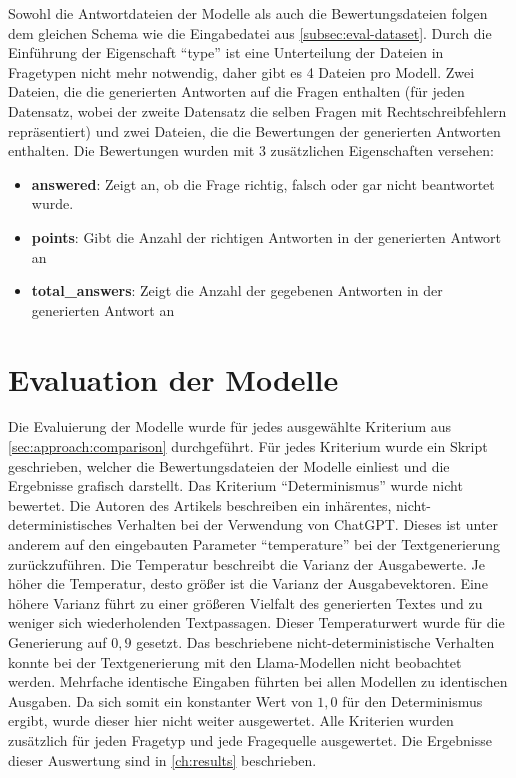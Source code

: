 Sowohl die Antwortdateien der Modelle als auch die Bewertungsdateien folgen dem gleichen Schema wie die Eingabedatei aus \cref{subsec:eval-dataset}. Durch die Einführung der Eigenschaft \enquote{type} ist eine Unterteilung der Dateien in Fragetypen nicht mehr notwendig, daher gibt es 4 Dateien pro Modell.
Zwei Dateien, die die generierten Antworten auf die Fragen enthalten (für jeden Datensatz, wobei der zweite Datensatz die selben Fragen mit Rechtschreibfehlern repräsentiert) und zwei Dateien, die die Bewertungen der generierten Antworten enthalten.
Die Bewertungen wurden mit 3 zusätzlichen Eigenschaften versehen:

\begin{itemize}
    \item \textbf{answered}: Zeigt an, ob die Frage richtig, falsch oder gar nicht beantwortet wurde.
    \item \textbf{points}: Gibt die Anzahl der richtigen Antworten in der generierten Antwort an
    \item \textbf{total\_answers}: Zeigt die Anzahl der gegebenen Antworten in der generierten Antwort an
\end{itemize}

\section{Evaluation der Modelle}\label{sec:evaluation}
Die Evaluierung der Modelle wurde für jedes ausgewählte Kriterium aus \cref{sec:approach:comparison} durchgeführt.
Für jedes Kriterium wurde ein Skript geschrieben, welcher die Bewertungsdateien der Modelle einliest und die Ergebnisse grafisch darstellt.
Das Kriterium \enquote{Determinismus} wurde nicht bewertet.
Die Autoren des Artikels \citet{chatgpt_qas} beschreiben ein inhärentes, nicht-deterministisches Verhalten bei der Verwendung von ChatGPT.
Dieses ist unter anderem auf den eingebauten Parameter \enquote{temperature} bei der Textgenerierung zurückzuführen.
Die Temperatur beschreibt die Varianz der Ausgabewerte.
Je höher die Temperatur, desto größer ist die Varianz der Ausgabevektoren.
Eine höhere Varianz führt zu einer größeren Vielfalt des generierten Textes und zu weniger sich wiederholenden Textpassagen.
Dieser Temperaturwert wurde für die Generierung auf $0,9$ gesetzt.
Das beschriebene nicht-deterministische Verhalten konnte bei der Textgenerierung mit den Llama-Modellen nicht beobachtet werden.
Mehrfache identische Eingaben führten bei allen Modellen zu identischen Ausgaben.
Da sich somit ein konstanter Wert von $1,0$ für den Determinismus ergibt, wurde dieser hier nicht weiter ausgewertet.
Alle Kriterien wurden zusätzlich für jeden Fragetyp und jede Fragequelle ausgewertet.
Die Ergebnisse dieser Auswertung sind in \cref{ch:results} beschrieben.\\

